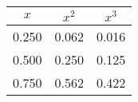 \begin{tabular}{ccc}
\hline \hline
  $x$ &  $x^2$ &  $x^3$ \\
\hline \hline
0.250 &  0.062 &  0.016 \\
0.500 &  0.250 &  0.125 \\
0.750 &  0.562 &  0.422 \\
\hline \hline
\end{tabular}
